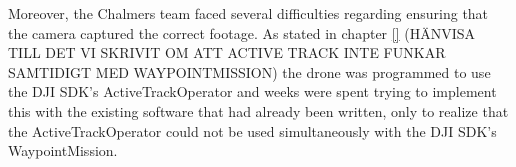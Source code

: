 Moreover, the Chalmers team faced several difficulties regarding ensuring that the camera captured the correct footage. As stated in chapter \ref{} (HÄNVISA TILL DET VI SKRIVIT OM ATT ACTIVE TRACK INTE FUNKAR SAMTIDIGT MED WAYPOINTMISSION) the drone was programmed to use the DJI SDK's ActiveTrackOperator and weeks were spent trying to implement this with the existing software that had already been written, only to realize that the ActiveTrackOperator could not be used simultaneously with the DJI SDK's WaypointMission. 


